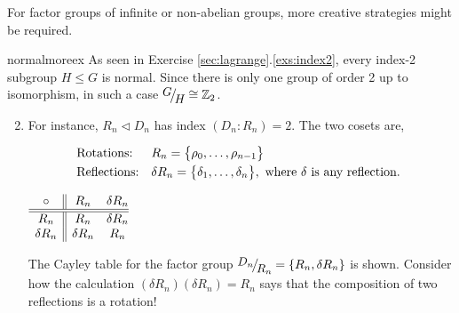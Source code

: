 \goodbreak


For factor groups of infinite or non-abelian groups, more creative strategies might be required.

\begin{examples}{}{normalmoreex}
	\exstart As seen in Exercise \ref*{sec:lagrange}.\ref{exs:index2}, every index-2 subgroup $H\le G$ is normal. Since there is only one group of order 2 up to isomorphism, in such a case $\quotient GH\cong\Z_2$.\vspace{-5pt}
	\begin{enumerate}\setcounter{enumi}{1}
	  \item[] For instance, $R_n\triangleleft D_n$ has index $(D_n:R_n)=2$. The two cosets are,\par
	  \begin{minipage}[t]{0.8\linewidth}\vspace{-18pt}
	  	\[
				\begin{array}{@{}ll}
					\text{Rotations:}&R_n=\bigl\{\rho_0,\ldots,\rho_{n-1}\bigr\}\\[3pt]
		  		\text{Reflections:}&\delta R_n=\bigl\{\delta_1,\ldots,\delta_n\bigr\}, \text{ where $\delta$ is any reflection.}
				\end{array}
		  \]
	  \end{minipage}
	  \hfill
	  \begin{minipage}[t]{0.19\linewidth}\vspace{-20pt}
	  	\flushright$\begin{array}{c||cc@{}}
	  		\circ&R_n&\delta R_n\\\hline\hline
	  		R_n&R_n&\delta R_n\\
	  		\delta R_n&\delta R_n&R_n
	  	\end{array}$
	  \end{minipage}\smallbreak
		The Cayley table for the factor group $\quotient{D_n}{R_n}=\{R_n,\delta R_n\}$ is shown. Consider how the calculation $(\delta R_n)(\delta R_n)=R_n$ says that the composition of two reflections is a rotation!
	  
	  

\end{enumerate}
\end{examples}
